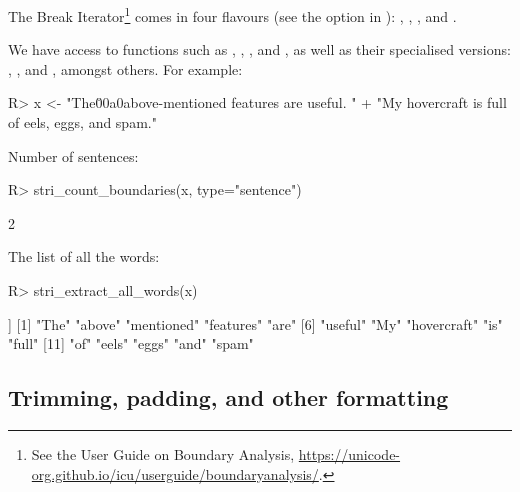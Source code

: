 \documentclass[nojss]{jss}
\begin{document}
The  Break Iterator\footnote{See the  User Guide
on {Boundary Analysis}, \url{https://unicode-org.github.io/icu/userguide/boundaryanalysis/}.}
comes in four flavours (see the  option
in ):
, , , and .

We have access to functions such as
,
,
, and
,
as well as their specialised
versions:
,
, and
, amongst others.
For example:


\begin{Schunk}
\begin{Sinput}
R> x <- "The\u00a0above-mentioned    features are useful. " %s+%
+    "My hovercraft is full of eels, eggs, and spam."
\end{Sinput}
\end{Schunk}

Number of sentences:

\begin{Schunk}
\begin{Sinput}
R> stri_count_boundaries(x, type="sentence")
\end{Sinput}
\begin{Soutput}
[1] 2
\end{Soutput}
\end{Schunk}

The list of all the words:

\begin{Schunk}
\begin{Sinput}
R> stri_extract_all_words(x)
\end{Sinput}
\begin{Soutput}
[[1]]
 [1] "The"        "above"      "mentioned"  "features"   "are"
 [6] "useful"     "My"         "hovercraft" "is"         "full"
[11] "of"         "eels"       "eggs"       "and"        "spam"
\end{Soutput}
\end{Schunk}





\subsection{Trimming, padding, and other formatting}
\end{document}
